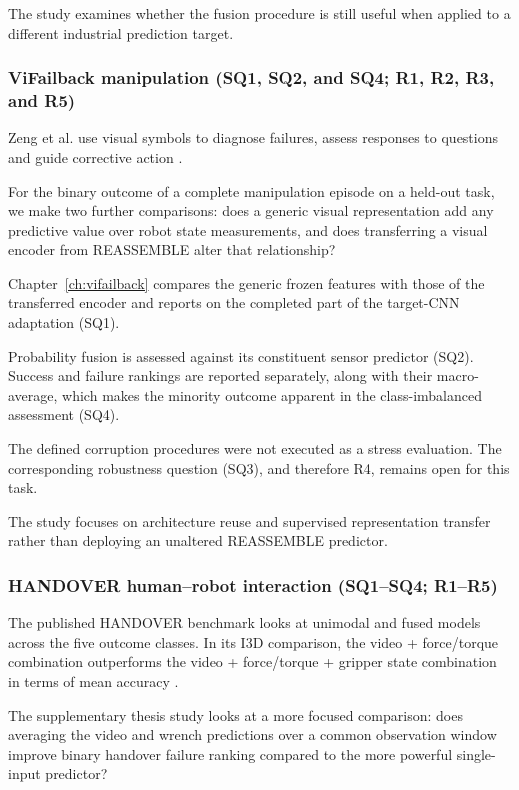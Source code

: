 The study examines whether the fusion procedure is still useful when applied to a different
industrial prediction target.

\subsubsection*{ViFailback manipulation (SQ1, SQ2, and SQ4; R1, R2, R3, and R5)}

Zeng et al. use visual symbols to diagnose failures, assess responses to questions and guide
corrective action \citep[PDF pp.~7--8, Tables~2--4]{Zeng2026ViFailback}.

For the binary outcome of a complete manipulation episode on a held-out task, we make two further
comparisons: does a generic visual representation add any predictive value over robot state
measurements, and does transferring a visual encoder from REASSEMBLE alter that relationship?

Chapter~\ref{ch:vifailback} compares the generic frozen features with those of the transferred
encoder and reports on the completed part of the target-CNN adaptation (SQ1).

Probability fusion is assessed against its constituent sensor predictor (SQ2). Success and failure
rankings are reported separately, along with their macro-average, which makes the minority outcome
apparent in the class-imbalanced assessment (SQ4).

The defined corruption procedures were not executed as a stress evaluation. The corresponding
robustness question (SQ3), and therefore R4, remains open for this task.

The study focuses on architecture reuse and supervised representation transfer rather than deploying
an unaltered REASSEMBLE predictor.

\subsubsection*{HANDOVER human--robot interaction (SQ1--SQ4; R1--R5)}

The published HANDOVER benchmark looks at unimodal and fused models across the five outcome classes.
In its I3D comparison, the video + force/torque combination outperforms the video + force/torque +
gripper state combination in terms of mean accuracy \citep[PDF p.~7,
Table~III]{Thoduka2024Handover}.

The supplementary thesis study looks at a more focused comparison: does averaging the video and
wrench predictions over a common observation window improve binary handover failure ranking compared
to the more powerful single-input predictor?

